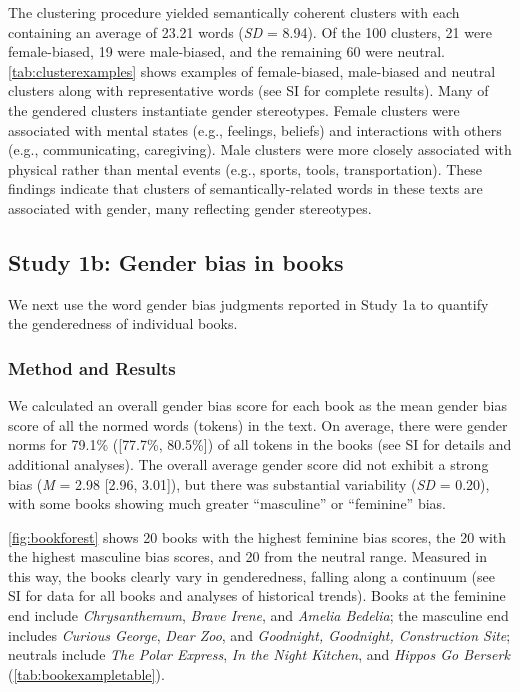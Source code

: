 \documentclass[
  english,
  ,man,floatsintext]{apa6}
\begin{document}
The clustering procedure yielded semantically coherent clusters with each containing an average of 23.21 words (\emph{SD} = 8.94). Of the 100 clusters, 21 were female-biased, 19 were male-biased, and the remaining 60 were neutral. \autoref{tab:clusterexamples} shows examples of female-biased, male-biased and neutral clusters along with representative words (see SI for complete results). Many of the gendered clusters instantiate gender stereotypes. Female clusters were associated with mental states (e.g., feelings, beliefs) and interactions with others (e.g., communicating, caregiving). Male clusters were more closely associated with physical rather than mental events (e.g., sports, tools, transportation). These findings indicate that clusters of semantically-related words in these texts are associated with gender, many reflecting gender stereotypes.

\hypertarget{study-1b-gender-bias-in-books}{%
\subsection{Study 1b: Gender bias in books}\label{study-1b-gender-bias-in-books}}

We next use the word gender bias judgments reported in Study 1a to quantify the genderedness of individual books.

\hypertarget{method-and-results}{%
\subsubsection{Method and Results}\label{method-and-results}}

We calculated an overall gender bias score for each book as the mean gender bias score of all the normed words (tokens) in the text. On average, there were gender norms for 79.1\% ({[}77.7\%, 80.5\%{]}) of all tokens in the books (see SI for details and additional analyses). The overall average gender score did not exhibit a strong bias (\emph{M} = 2.98 {[}2.96, 3.01{]}), but there was substantial variability (\emph{SD} = 0.20), with some books showing much greater \enquote{masculine} or \enquote{feminine} bias.

\autoref{fig:bookforest} shows 20 books with the highest feminine bias scores, the 20 with the highest masculine bias scores, and 20 from the neutral range. Measured in this way, the books clearly vary in genderedness, falling along a continuum (see SI for data for all books and analyses of historical trends). Books at the feminine end include \emph{Chrysanthemum}, \emph{Brave Irene}, and \emph{Amelia Bedelia}; the masculine end includes \emph{Curious George}, \emph{Dear Zoo}, and \emph{Goodnight, Goodnight, Construction Site}; neutrals include \emph{The Polar Express}, \emph{In the Night Kitchen}, and \emph{Hippos Go Berserk} (\autoref{tab:bookexampletable}).
\end{document}
